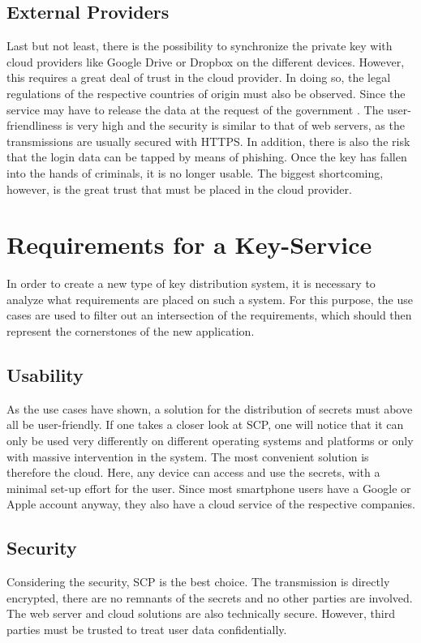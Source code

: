 \documentclass[12pt,oneside,a4paper,parskip]{scrbook}
\begin{document}
\subsection{External Providers}
Last but not least, there is the possibility to synchronize the private key with cloud providers like Google Drive or Dropbox on the different devices. However, this requires a great deal of trust in the cloud provider. In doing so, the legal regulations of the respective countries of origin must also be observed. Since the service may have to release the data at the request of the government \parencite{heise_us_nodate}. \newline
The user-friendliness is very high and the security is similar to that of web servers, as the transmissions are usually secured with HTTPS. In addition, there is also the risk that the login data can be tapped by means of phishing. Once the key has fallen into the hands of criminals, it is no longer usable. The biggest shortcoming, however, is the great trust that must be placed in the cloud provider. 


\section{Requirements for a Key-Service}
In order to create a new type of key distribution system, it is necessary to analyze what requirements are placed on such a system. For this purpose, the use cases are used to filter out an intersection of the requirements, which should then represent the cornerstones of the new application.

\subsection{Usability}
As the use cases have shown, a solution for the distribution of secrets must above all be user-friendly. If one takes a closer look at SCP, one will notice that it can only be used very differently on different operating systems and platforms or only with massive intervention in the system. The most convenient solution is therefore the cloud. Here, any device can access and use the secrets, with a minimal set-up effort for the user. Since most smartphone users have a Google or Apple account anyway, they also have a cloud service of the respective companies.

\newpage
\subsection{Security}
Considering the security, SCP is the best choice. The transmission is directly encrypted, there are no remnants of the secrets and no other parties are involved. The web server and cloud solutions are also technically secure. However, third parties must be trusted to treat user data confidentially.
\end{document}
